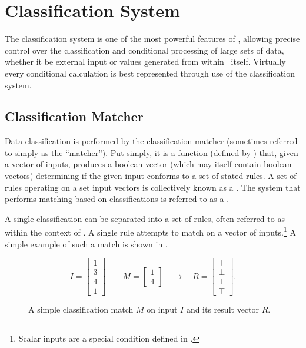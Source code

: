 \chapter{Classification System}
The classification system is one of the most powerful features of \lang,
allowing precise control over the classification and conditional processing of
large sets of data, whether it be external input or values generated from within
\lang\ itself. Virtually every conditional calculation is best represented
through use of the classification system.


\section{Classification Matcher}
Data classification is performed by the classification matcher (sometimes
referred to simply as the ``matcher''). Put simply, it is a function (defined by
) that, given a vector of inputs, produces a boolean vector (which
may itself contain boolean vectors) determining if the given input conforms to a
set of stated rules. A set of rules operating on a set input vectors is
collectively known as a . The system that performs matching
based on classifications is referred to as a .

A single classification can be separated into a set of rules, often referred to
as  within the context of \lang. A single rule attempts to match
on a vector of inputs.\footnote{Scalar inputs are a special condition defined in
.} A simple example of such a match is shown in
.

\begin{figure}[h]
  $$
    I = \left[
      \begin{array}{c}
        1 \\ 3 \\ 4 \\ 1
      \end{array}
    \right]
    \qquad
    M = \left[
      \begin{array}{c}
        1 \\ 4
      \end{array}
    \right]
    \quad
    \to
    \quad
    R = \left[
      \begin{array}{c}
        \top \\ \bot \\ \top \\ \top
      \end{array}
    \right].
  $$

  \caption{A simple classification match $M$ on input $I$ and its result vector
  $R$.}
  \label{f:cmatch-ex-single}
\end{figure}

